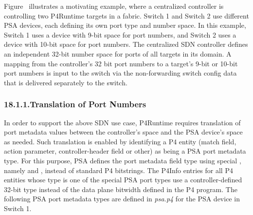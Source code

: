 \documentclass[11pt]{article}
\begin{document}
{%
\noindent{}Figure~ illustrates a motivating example,
where a centralized controller is controlling two P4Runtime targets in a fabric.
Switch 1 and Switch 2 use different PSA devices, each defining its own port type
and number space. In this example, Switch 1 uses a device with 9-bit space for
port numbers, and Switch 2 uses a device with 10-bit space for port numbers. The
centralized SDN controller defines an independent 32-bit number space for ports
of all targets in its domain. A mapping from the controller's 32 bit port
numbers to a target's 9-bit or 10-bit port numbers is input to the switch via
the non-forwarding switch config data that is delivered separately to the
switch.%

\subsubsection{18.1.1.\hspace*{0.5em}Translation of Port Numbers}\label{sec-translation-of-port-numbers}%

\noindent{}In order to support the above SDN use case, P4Runtime requires translation of
port metadata values between the controller's space and the PSA device's space
as needed. Such translation is enabled by identifying a P4 entity (match field,
action parameter, controller-header field or other) as being a PSA port metadata
type. For this purpose, PSA defines the port metadata field type using special
, namely  and
, instead of standard P4 bitstrings. The P4Info entries for
all P4 entities whose type is one of the special PSA port types use a
controller-defined 32-bit type instead of the data plane bitwidth defined in the
P4 program. The following PSA port metadata types are defined in \emph{psa.p4} for
the PSA device in Switch 1.%

}
\end{document}
